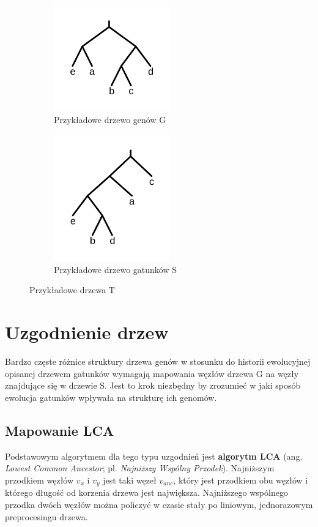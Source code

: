 \documentclass[licencjacka]{pracamgr}
\begin{document}
\begin{figure}[H]
\centering
\begin{subfigure}{.5\textwidth}
  \centering
  \includegraphics[width=50mm]{./pictures/gene.png}
  \caption{Przykładowe drzewo genów G}
  \label{fig:sub2}
\end{subfigure}%
\begin{subfigure}{.5\textwidth}
  \centering
  \includegraphics[width=50mm]{./pictures/species.png}
  \caption{Przykładowe drzewo gatunków S}
  \label{fig:sub1}
\end{subfigure}%
\caption{Przykładowe drzewa T \cite{gsevol}}
\label{fig:test}
\end{figure}

\section{Uzgodnienie drzew}
Bardzo częste różnice struktury drzewa genów w stosunku do historii ewolucyjnej opisanej drzewem gatunków wymagają mapowania węzłów drzewa G na węzły znajdujące się w drzewie S. Jest to krok niezbędny by zrozumieć w jaki sposób ewolucja gatunków wpływała na strukturę ich genomów. 

\subsection{Mapowanie LCA}
Podstawowym algorytmem dla tego typu uzgodnień jest \textbf{algorytm LCA} (ang. \textit{Lowest Common Ancestor}; pl. \textit{Najniższy Wspólny Przodek}). Najniższym przodkiem węzłów $v_x$ i $v_y$ jest taki węzeł $v_{anc}$, który jest przodkiem obu węzłów i którego długość od korzenia drzewa jest największa. Najniższego wspólnego przodka dwóch węzłów można policzyć w czasie stały po liniowym, jednorazowym preprocesingu drzewa. 
\end{document}
